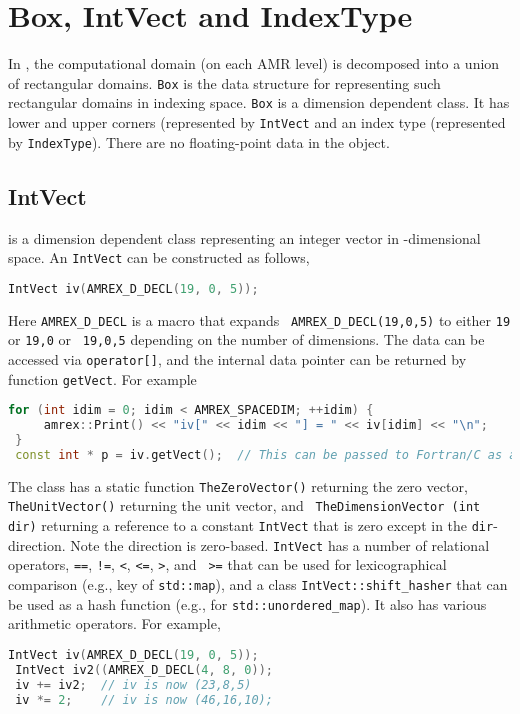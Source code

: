 \section{Box, IntVect and IndexType}
\label{sec:basics:box}

In \amrex, the computational domain (on each AMR level) is decomposed
into a union of rectangular domains.  {\tt Box} is the data
structure for representing such rectangular domains in indexing space.
{\tt Box} is a dimension dependent class.  It has lower and upper
corners (represented by {\tt IntVect} and an index type
(represented by {\tt IndexType}).  There are no floating-point data in
the object.

\subsection{IntVect}

{} is a dimension dependent class representing an
integer vector in {}-dimensional space.  An
{\tt IntVect} can be constructed as follows,
\begin{lstlisting}[language=cpp]
 IntVect iv(AMREX_D_DECL(19, 0, 5));
\end{lstlisting}
Here {\tt AMREX\_D\_DECL} is a macro that expands {\tt
  AMREX\_D\_DECL(19,0,5)} to either {\tt 19} or {\tt 19,0} or {\tt
  19,0,5} depending on the number of dimensions.  The data can be
accessed via {\tt operator[]}, and the internal data pointer can be
returned by function {\tt getVect}.  For example
\begin{lstlisting}[language=cpp]
 for (int idim = 0; idim < AMREX_SPACEDIM; ++idim) {
     amrex::Print() << "iv[" << idim << "] = " << iv[idim] << "\n";
 }
 const int * p = iv.getVect();  // This can be passed to Fortran/C as an array
\end{lstlisting}

The class has a static function {\tt TheZeroVector()} returning the
zero vector, {\tt TheUnitVector()} returning the unit vector, and {\tt
  TheDimensionVector (int dir)} returning a reference to a constant
{\tt IntVect} that is zero except in the {\tt dir}-direction.  Note
the direction is zero-based.  {\tt IntVect} has a number of relational
operators, {\tt ==}, {\tt !=}, {\tt <}, {\tt <=}, {\tt >}, and {\tt
  >=} that can be used for lexicographical comparison (e.g., key of
{\tt std::map}), and a class {\tt IntVect::shift\_hasher} that can be
used as a hash function (e.g., for {\tt std::unordered\_map}).  It
also has various arithmetic operators.  For example,
\begin{lstlisting}[language=cpp]
 IntVect iv(AMREX_D_DECL(19, 0, 5));
 IntVect iv2((AMREX_D_DECL(4, 8, 0));
 iv += iv2;  // iv is now (23,8,5)
 iv *= 2;    // iv is now (46,16,10);
\end{lstlisting}

